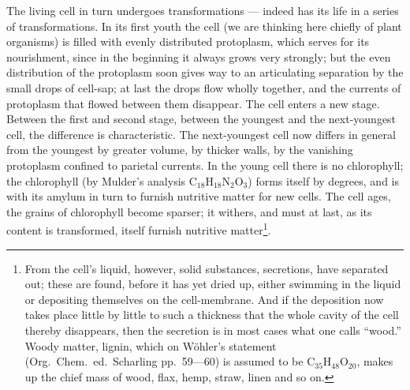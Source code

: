 \documentclass[12pt,a4paper]{book}
\begin{document}
The living cell in turn undergoes transformations --- indeed has its life in a
series of transformations. In its first youth the cell (we are thinking here
chiefly of plant organisms) is filled with evenly distributed protoplasm, which
serves for its nourishment, since in the beginning it always grows very
strongly; but the even distribution of the protoplasm soon gives way to an
articulating separation by the small drops of cell-sap; at last the drops flow
wholly together, and the currents of protoplasm that flowed between them
disappear. The cell enters a new stage. Between the first and second stage,
between the youngest and the next-youngest cell, the difference is
characteristic. The next-youngest cell now differs in general from the youngest
by greater volume, by thicker walls, by the vanishing protoplasm confined to
parietal currents. In the young cell there is no chlorophyll; the chlorophyll
(by Mulder's analysis
$\mathrm{C}_{18}\mathrm{H}_{18}\mathrm{N}_2\mathrm{O}_3$) forms itself by
degrees, and is with its amylum in turn to furnish nutritive matter for new
cells. The cell ages, the grains of chlorophyll become sparser; it withers, and
must at last, as its content is transformed, itself furnish
nutritive matter\footnote{From the cell's liquid, however, solid substances,
secretions, have separated out; these are found, before it has yet dried up,
either swimming in the liquid or depositing themselves on the cell-membrane.
And if the deposition now takes place little by little to such a thickness that
the whole cavity of the cell thereby disappears, then the secretion is in most
cases what one calls ``wood.'' Woody matter, lignin, which on Wöhler's
statement (Org.\ Chem.\ ed.\ Scharling pp.~59---60) is assumed to be
$\mathrm{C}_{35}\mathrm{H}_{48}\mathrm{O}_{20}$, makes up the chief mass of
wood, flax, hemp, straw, linen and so on.}.
\end{document}
